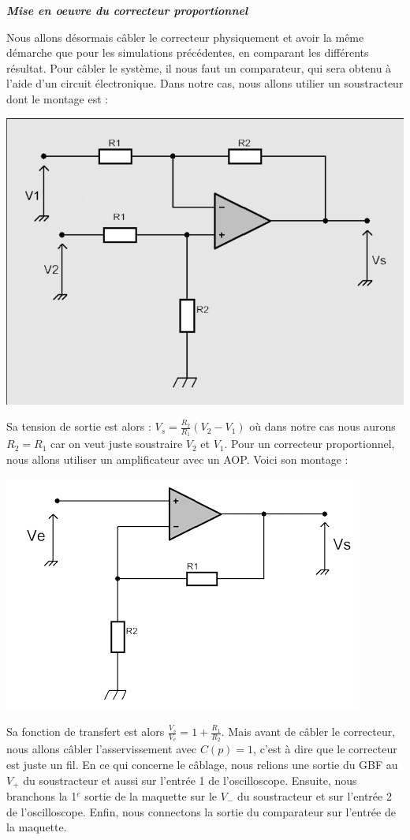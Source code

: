 \documentclass[12pt]{article}
\begin{document}
\Large \textit{ \textbf{Mise en oeuvre du correcteur proportionnel}}

\normalsize Nous allons désormais câbler le correcteur physiquement et avoir la même démarche que pour les simulations précédentes, en comparant les différents résultat.
Pour câbler le système, il nous faut un comparateur, qui sera obtenu à l'aide d'un circuit électronique. Dans notre cas, nous allons utilier un soustracteur dont le montage est  :
\begin{center}
    \includegraphics[width = 8 cm]{TP3/soustracteur.png}
\end{center}
Sa tension de sortie est alors : $V_s = \frac{R_2}{R_1}(V_2-V_1)$ où dans notre cas nous aurons $R_2 = R_1$ car on veut juste soustraire $V_2$ et $V_1$.
Pour un correcteur proportionnel, nous allons utiliser un amplificateur avec un AOP. Voici son montage : 
\begin{center}
    \includegraphics[width = 8 cm]{TP3/ampli_non_inv.png}
\end{center}
Sa fonction de transfert est alors $\frac{V_s}{V_e} = 1 + \frac{R_1}{R_2}$. Mais avant de câbler le correcteur, nous allons câbler l'asservissement avec $C(p) = 1$, c'est à dire que le correcteur est juste un fil. 
En ce qui concerne le câblage, nous relions une sortie du GBF au $V_+$ du soustracteur et aussi sur l'entrée 1 de l'oscilloscope. Ensuite, nous branchons la 1$^{e}$ sortie de la maquette sur le $V_-$ du soustracteur et sur l'entrée 2 de l'oscilloscope. Enfin, nous connectons la sortie du comparateur sur l'entrée de la maquette.
\end{document}
